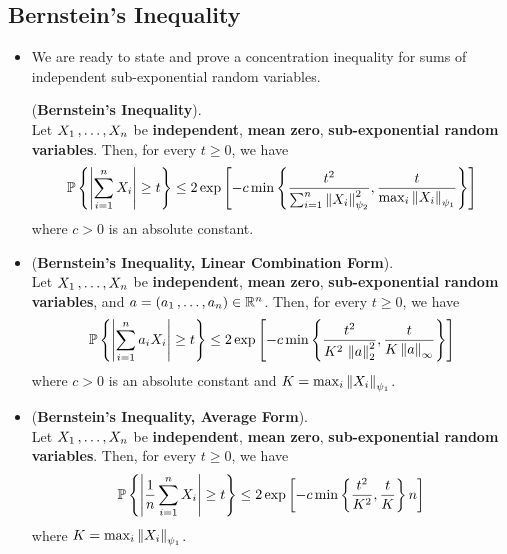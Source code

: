 \documentclass[11pt]{article}
\begin{document}
\subsection{Bernstein's Inequality}
\begin{itemize}
\item We are ready to state and prove a concentration inequality for sums of independent sub-exponential random variables.
\begin{proposition} (\textbf{Bernstein's Inequality}).  \citep{vershynin2018high}\\
Let $X_1 \,{,}\ldots{,}\, X_n$ be \textbf{independent}, \textbf{mean zero}, \textbf{sub-exponential random variables}. Then, for every $t \ge 0$, we have
\begin{align}
{\mathbb P}\left\{\left\lvert \sum_{i=1}^{n}X_i \right\rvert \ge t\right\} \le 2 \exp\left[- c \min\left\{\frac{t^2}{\sum_{i=1}^{n}\left\|X_i\right\|_{\psi_2}^2},  \frac{t}{\max_i \left\|X_i\right\|_{\psi_1}}\right\}\right] \label{ineqn: bernstein_inequality}
\end{align}
where $c > 0$ is an absolute constant.
\end{proposition}

\item 
\begin{proposition} (\textbf{Bernstein's Inequality, Linear Combination Form}).  \citep{vershynin2018high}\\
Let $X_1 \,{,}\ldots{,}\, X_n$ be \textbf{independent}, \textbf{mean zero}, \textbf{sub-exponential random variables}, and $a = (a_1 \,{,}\ldots{,}\, a_n) \in {\mathbb R}^n$. Then, for every $t \ge 0$, we have
\begin{align}
{\mathbb P}\left\{\left\lvert \sum_{i=1}^{n}a_i X_i \right\rvert \ge t\right\} \le 2 \exp\left[- c \min\left\{\frac{t^2}{K^2\, \left\|a\right\|_{2}^2},  \frac{t}{K \left\|a\right\|_{\infty}}\right\}\right] \label{ineqn: bernstein_inequality_linear_comb}
\end{align}
where $c > 0$ is an absolute constant and $K = \max_i \left\|X_i\right\|_{\psi_1}$.
\end{proposition}

\item \begin{corollary}(\textbf{Bernstein's Inequality, Average Form}).  \citep{vershynin2018high}\\
Let $X_1 \,{,}\ldots{,}\, X_n$ be \textbf{independent}, \textbf{mean zero}, \textbf{sub-exponential random variables}. Then, for every $t \ge 0$, we have
\begin{align}
{\mathbb P}\left\{\left\lvert \frac{1}{n}\sum_{i=1}^{n}X_i \right\rvert \ge t\right\} \le 2 \exp\left[- c \min\left\{\frac{t^2}{K^2},  \frac{t}{K}\right\}n\right] \label{ineqn: bernstein_inequality_average}
\end{align} where $K = \max_i \left\|X_i\right\|_{\psi_1}$.
\end{corollary}


\end{itemize}
\end{document}
